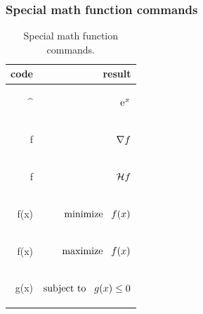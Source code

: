 \documentclass[report,english]{enacom}
\begin{document}
\subsubsection{Special math function commands} 
    \begin{table}[H]
		\begin{tabular}{rr}
            code & result \\ \hline
            \begin{lcode}
            \e^\pi\end{lcode} 
            & $\mathrm{e}^\pi$\\
            \begin{lcode}
            \gradient f\end{lcode} 
            & $\nabla f$\\
            \begin{lcode}
            \hessian f\end{lcode} 
            & $\mathcal{H} f$\\
             \begin{lcode}
            \mi f(x)\end{lcode} 
            & $\operatorname{minimize~~} f(x)$\\
            \begin{lcode}
            \ma f(x)\end{lcode} 
            & $\operatorname{maximize~~} f(x)$\\
            \begin{lcode}
            \sto g(x) \leq 0\end{lcode} 
            & $\operatorname{subject~to~~} g(x) \leq 0$\\
		\end{tabular} 
		\caption{Special math function commands.}
	\end{table}
    
\end{document}
